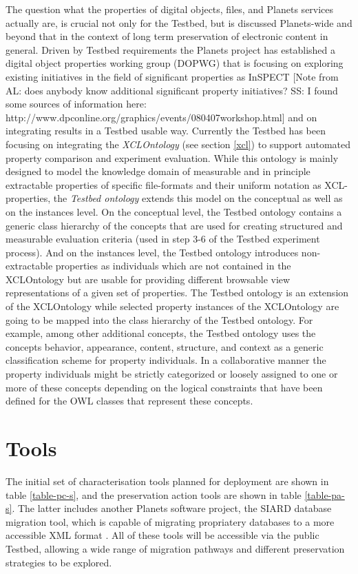 \documentclass{article}
\begin{document}
The question what the properties of digital objects, files, and Planets services
actually are, is crucial not only for the Testbed, but is discussed Planets-wide
and beyond that in the context of long term preservation of electronic content in
general. Driven by Testbed requirements the Planets project has established a
digital object properties working group (DOPWG) that is focusing on exploring
existing initiatives in the field of significant properties as InSPECT
\cite{inspect} [Note from AL: does anybody know additional significant property
initiatives? SS: I found some sources of information here:
http://www.dpconline.org/graphics/events/080407workshop.html] and on integrating
results in a Testbed usable way. Currently the Testbed has been focusing on
integrating the \emph{XCLOntology} (see section \ref{xcl}) to support automated
property comparison and experiment evaluation. While this ontology is mainly
designed to model the knowledge domain of measurable and in principle extractable
properties of specific file-formats and their uniform notation as XCL-properties,
the \emph{Testbed ontology} extends this model on the conceptual as well as on
the instances level. On the conceptual level, the Testbed ontology contains a
generic class hierarchy of the concepts that are used for creating structured and
measurable evaluation criteria (used in step 3-6 of the Testbed experiment
process). And on the instances level, the Testbed ontology introduces
non-extractable properties as individuals which are not contained in the
XCLOntology but are usable for providing different browsable view representations
of a given set of properties. The Testbed ontology is an extension of the
XCLOntology while selected property instances of the XCLOntology are going to be
mapped into the class hierarchy of the Testbed ontology. For example, among other
additional concepts, the Testbed ontology uses the concepts behavior, appearance,
content, structure, and context \cite{rothbik1999} as a generic classification
scheme for property individuals. In a collaborative manner the property
individuals might be strictly categorized or loosely assigned to one or more of
these concepts depending on the logical constraints that have been defined for
the OWL classes that represent these concepts.


\section{Tools}
The initial set of characterisation tools planned for deployment are shown in
table \ref{table-pc-s}, and the preservation action tools are shown in table
\ref{table-pa-s}.  The latter includes another Planets software project, the
SIARD database migration tool, which is capable of migrating propriatery
databases to a more accessible XML format \cite{heusher-siard}. All of these
tools will be accessible via the public Testbed, allowing a wide range of
migration pathways and different preservation strategies to be explored.
\end{document}
